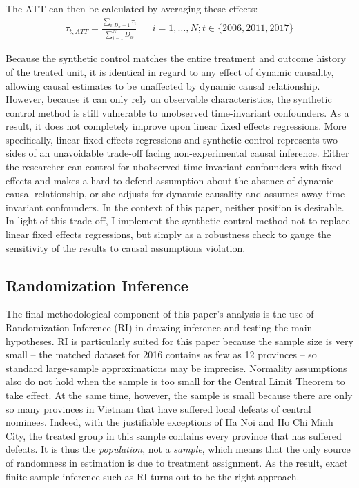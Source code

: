 \documentclass[12pt]{article}\usepackage[]{graphicx}\usepackage[]{color}
\newcommand{\1}{\mathbbm{1}}
\begin{document}
The ATT can then be calculated by averaging these effects:
\begin{align*}
	\tau_{t, ATT} = \frac{\sum_{i: D_{it}=1} \tau_i}{\sum_{i=1}^{N}D_{it}}  && i = 1,\dots,N; t \in \{2006, 2011, 2017\}
\end{align*}

Because the synthetic control matches the entire treatment and outcome history of the treated unit, it is identical in regard to any effect of dynamic causality, allowing causal estimates to be unaffected by dynamic causal relationship. However, because it can only rely on observable characteristics, the synthetic control method is still vulnerable to unobserved time-invariant confounders. As a result, it does not completely improve upon linear fixed effects regressions. More specifically, linear fixed effects regressions and synthetic control represents two sides of an unavoidable trade-off facing non-experimental causal inference. Either the researcher can control for ubobserved time-invariant confounders with fixed effects and makes a hard-to-defend assumption about the absence of dynamic causal relationship, or she adjusts for dynamic causality and assumes away time-invariant confounders. In the context of this paper, neither position is desirable. In light of this trade-off, I implement the synthetic control method not to replace linear fixed effects regressions, but simply as a robustness check to gauge the sensitivity of the results to causal assumptions violation.

\subsection{Randomization Inference}
The final methodological component of this paper's analysis is the use of Randomization Inference (RI) in drawing inference and testing the main hypotheses. RI is particularly suited for this paper because the sample size is very small -- the matched dataset for 2016 contains as few as 12 provinces -- so standard large-sample approximations may be imprecise. Normality assumptions also do not hold when the sample is too small for the Central Limit Theorem to take effect. At the same time, however, the sample is small because there are only so many provinces in Vietnam that have suffered local defeats of central nominees. Indeed, with the justifiable exceptions of Ha Noi and Ho Chi Minh City, the treated group in this sample contains every province that has suffered defeats. It is thus the \textit{population}, not a \textit{sample}, which means that the only source of randomness in estimation is due to treatment assignment. As the result, exact finite-sample inference such as RI turns out to be the right approach. 
\end{document}
